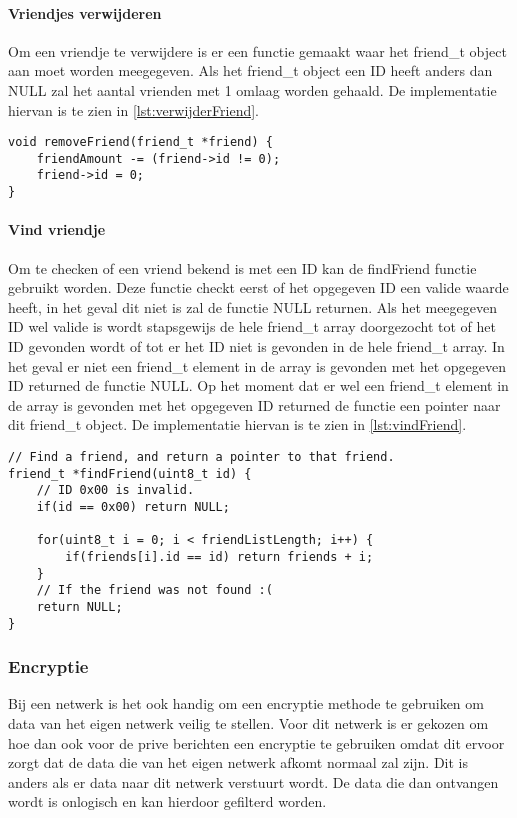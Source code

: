     \paragraph{Vriendjes verwijderen}
        Om een vriendje te verwijdere is er een functie gemaakt waar het friend\_t object aan moet worden meegegeven. Als het friend\_t object een ID heeft anders dan NULL zal het aantal vrienden met 1 omlaag worden gehaald. De implementatie hiervan is te zien in \autoref{lst:verwijderFriend}.
        \begin{lstlisting}[caption={Verwijder vriendje},captionpos=b,label={lst:verwijderFriend},style=c,xleftmargin=.\textwidth,xrightmargin=.\textwidth]
void removeFriend(friend_t *friend) {
    friendAmount -= (friend->id != 0);
    friend->id = 0;
}
        \end{lstlisting}

    \paragraph{Vind vriendje}
        Om te checken of een vriend bekend is met een ID kan de findFriend functie gebruikt worden. Deze functie checkt eerst of het opgegeven ID een valide waarde heeft, in het geval dit niet is zal de functie NULL returnen. Als het meegegeven ID wel valide is wordt stapsgewijs de hele friend\_t array doorgezocht tot of het ID gevonden wordt of tot er het ID niet is gevonden in de hele friend\_t array. In het geval er niet een friend\_t element in de array is gevonden met het opgegeven ID returned de functie NULL. Op het moment dat er wel een friend\_t element in de array is gevonden met het opgegeven ID returned de functie een pointer naar dit friend\_t object. De implementatie hiervan is te zien in \autoref{lst:vindFriend}.
        \begin{lstlisting}[caption={Vind vriendje},captionpos=b,label={lst:vindFriend},style=c,xleftmargin=.\textwidth,xrightmargin=.\textwidth]
// Find a friend, and return a pointer to that friend.
friend_t *findFriend(uint8_t id) {
    // ID 0x00 is invalid.   
    if(id == 0x00) return NULL;

    for(uint8_t i = 0; i < friendListLength; i++) {
        if(friends[i].id == id) return friends + i;
    }
    // If the friend was not found :(
    return NULL;
}
        \end{lstlisting}


\subsubsection{Encryptie}
Bij een netwerk is het ook handig om een encryptie methode te gebruiken om data van het eigen netwerk veilig te stellen.
Voor dit netwerk is er gekozen om hoe dan ook voor de prive berichten een encryptie te gebruiken omdat dit ervoor zorgt 
dat de data die van het eigen netwerk afkomt normaal zal zijn. Dit is anders als er data naar dit netwerk verstuurt wordt. De 
data die dan ontvangen wordt is onlogisch en kan hierdoor gefilterd worden. 

